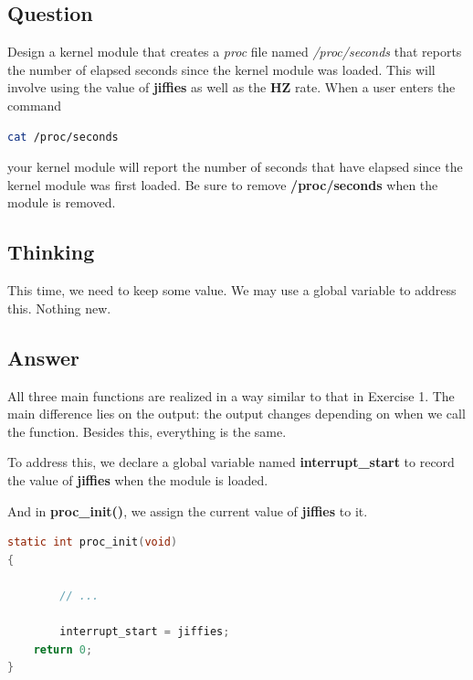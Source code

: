 \documentclass{article}
\begin{document}
    \subsection*{Question}
    Design a kernel module that creates a \textit{proc} file named \textit{/proc/seconds}
    that reports the number of elapsed seconds since the kernel module was loaded. This will involve using the value of \textbf{jiffies} as well as the \textbf{HZ}
    rate. When a user enters the command

    \begin{lstlisting}[language=bash]
cat /proc/seconds
    \end{lstlisting}

    your kernel module will report the number of seconds that have elapsed since the kernel module was first loaded. Be sure to remove \textbf{/proc/seconds} when the module is removed.
    
    \subsection*{Thinking} This time, we need to keep some value. We may use a global variable to address this. Nothing new.
    
    \subsection*{Answer}
    All three main functions are realized in a way similar to that in Exercise 1. The main difference lies on the output: the output changes depending on when we call the function. Besides this, everything is the same. 

    To address this, we declare a global variable named \textbf{interrupt\_start} to record the value of \textbf{jiffies} when the module is loaded. 

    And in \textbf{proc\_init()}, we assign the current value of \textbf{jiffies} to it. 

    \vspace{2pt}

    \begin{lstlisting}[language=c, caption={\textbf{proc\_init()}}]
static int proc_init(void)
{
        
        // ...

        interrupt_start = jiffies;
	return 0;
}
    \end{lstlisting}

    \vspace{2pt}
\end{document}
